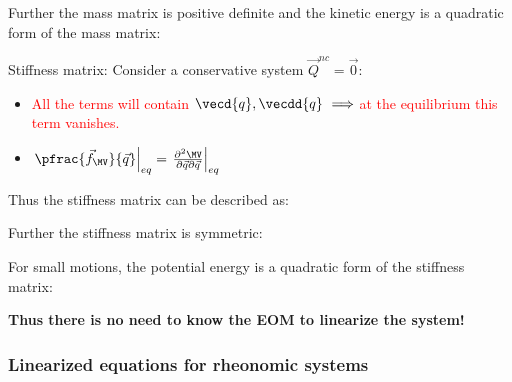 \documentclass[10pt,a4paper]{scrartcl}
\begin{document}
\begin{multicols*}{2}

Further the mass matrix is positive definite and the kinetic energy is a quadratic form of the mass matrix:


Stiffness matrix: Consider a conservative system $\vec{Q}^{nc}=\vec{0}$:


\begin{itemize}
\item \textcolor{red}{All the terms will contain $\vecd{q},\vecdd{q}\ \Longrightarrow$ at the equilibrium this term vanishes.}
\item \textcolor{green}{$\left.\pfrac{\vec{f}_\MV}{\vec{q}}\right|_{eq}=\left.\frac{\partial^2\MV}{\partial\vec{q}\partial\vec{q}}\right|_{eq}$}
\end{itemize}

Thus the stiffness matrix can be described as:


Further the stiffness matrix is symmetric:


For small motions, the potential energy is a quadratic form of the stiffness matrix:


\textbf{Thus there is no need to know the EOM to linearize the system!}

\subsubsection{Linearized equations for rheonomic systems}



\end{multicols*}
\end{document}
